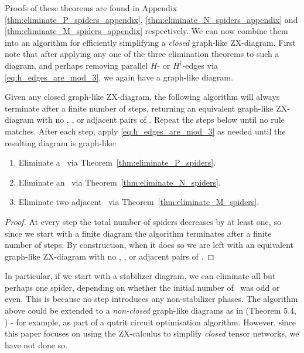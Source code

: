 \begin{theorem}\label{thm:eliminate_P_spiders}
	\eliminatePSpidersStatement
\end{theorem}

\begin{theorem}\label{thm:eliminate_N_spiders}
	\eliminateNSpidersStatement
\end{theorem}

\begin{theorem}\label{thm:eliminate_M_spiders}
	\eliminateMSpidersStatement
\end{theorem}

Proofs of these theorems are found in Appendix \ref{thm:eliminate_P_spiders_appendix}, \ref{thm:eliminate_N_spiders_appendix} and \ref{thm:eliminate_M_spiders_appendix} respectively. We can now combine them into an algorithm for efficiently simplifying a \emph{closed} graph-like ZX-diagram. First note that after applying any one of the three elimination theorems to such a diagram, and perhaps removing parallel $H$- or $H^\dagger$-edges via \eqref{eq:h_edges_are_mod_3}, we again have a graph-like diagram.

\begin{theorem}\label{thm:simplification_algorithm_works}
	Given any closed graph-like ZX-diagram, the following algorithm will always terminate after a finite number of steps, returning an equivalent graph-like ZX-diagram with no \Nspiders, \Pspiders, or adjacent pairs of \Mspiders. Repeat the steps below until no rule matches. After each step, apply \eqref{eq:h_edges_are_mod_3} as needed until the resulting diagram is graph-like:
	\begin{enumerate}
		\item Eliminate a \Pspider\ via Theorem~\ref{thm:eliminate_P_spiders}.
		\item Eliminate an \Nspider\ via Theorem~\ref{thm:eliminate_N_spiders}.
		\item Eliminate two adjacent \Mspiders\ via Theorem~\ref{thm:eliminate_M_spiders}.
	\end{enumerate}
	\begin{proof}
		At every step the total number of spiders decreases by at least one, so since we start with a finite diagram the algorithm terminates after a finite number of steps. By construction, when it does so we are left with an equivalent graph-like ZX-diagram with no \Nspiders, \Pspiders, or adjacent pairs of \Mspiders.
	\end{proof}
\end{theorem}

In particular, if we start with a stabilizer diagram, we can eliminate all but perhaps one spider, depending on whether the initial number of \Mspiders\ was odd or even. This is because no step introduces any non-stabilizer phases. The algorithm above could be extended to a \emph{non-closed} graph-like diagrams as in (Theorem 5.4, \cite{graph_theoretic_simplification}) - for example, as part of a qutrit circuit optimisation algorithm. However, since this paper focuses on using the ZX-calculus to simplify \emph{closed} tensor networks, we have not done so.